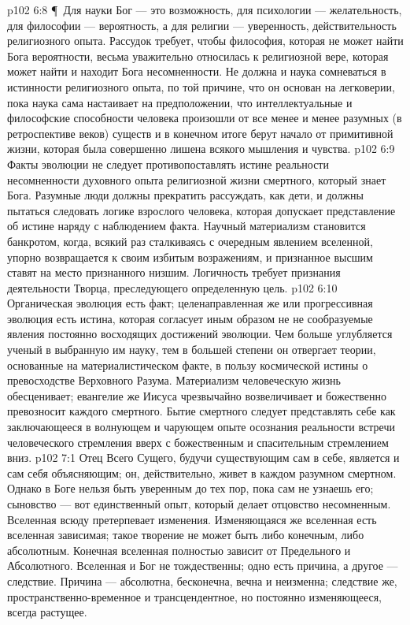\vs p102 6:8 \P\ Для науки Бог --- это возможность, для психологии --- желательность, для философии --- вероятность, а для религии --- уверенность, действительность религиозного опыта. Рассудок требует, чтобы философия, которая не может найти Бога вероятности, весьма уважительно относилась к религиозной вере, которая может найти и находит Бога несомненности. Не должна и наука сомневаться в истинности религиозного опыта, по той причине, что он основан на легковерии, пока наука сама настаивает на предположении, что интеллектуальные и философские способности человека произошли от все менее и менее разумных (в ретроспективе веков) существ и в конечном итоге берут начало от примитивной жизни, которая была совершенно лишена всякого мышления и чувства.
\vs p102 6:9 Факты эволюции не следует противопоставлять истине реальности несомненности духовного опыта религиозной жизни смертного, который знает Бога. Разумные люди должны прекратить рассуждать, как дети, и должны пытаться следовать логике взрослого человека, которая допускает представление об истине наряду с наблюдением факта. Научный материализм становится банкротом, когда, всякий раз сталкиваясь с очередным явлением вселенной, упорно возвращается к своим избитым возражениям, и признанное высшим ставят на место признанного низшим. Логичность требует признания деятельности Творца, преследующего определенную цель.
\vs p102 6:10 Органическая эволюция есть факт; целенаправленная же или прогрессивная эволюция есть истина, которая согласует иным образом не не сообразуемые явления постоянно восходящих достижений эволюции. Чем больше углубляется ученый в выбранную им науку, тем в большей степени он отвергает теории, основанные на материалистическом факте, в пользу космической истины о превосходстве Верховного Разума. Материализм человеческую жизнь обесценивает; евангелие же Иисуса чрезвычайно возвеличивает и божественно превозносит каждого смертного. Бытие смертного следует представлять себе как заключающееся в волнующем и чарующем опыте осознания реальности встречи человеческого стремления вверх с божественным и спасительным стремлением вниз.
\vs p102 7:1 Отец Всего Сущего, будучи существующим сам в себе, является и сам себя объясняющим; он, действительно, живет в каждом разумном смертном. Однако в Боге нельзя быть уверенным до тех пор, пока сам не узнаешь его; сыновство --- вот единственный опыт, который делает отцовство несомненным. Вселенная всюду претерпевает изменения. Изменяющаяся же вселенная есть вселенная зависимая; такое творение не может быть либо конечным, либо абсолютным. Конечная вселенная полностью зависит от Предельного и Абсолютного. Вселенная и Бог не тождественны; одно есть причина, а другое --- следствие. Причина --- абсолютна, бесконечна, вечна и неизменна; следствие же, пространственно\hyp{}временное и трансцендентное, но постоянно изменяющееся, всегда растущее.

